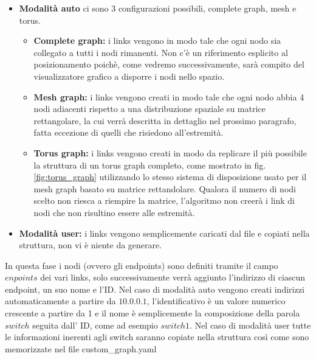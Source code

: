 \documentclass[binding=0.6cm]{sapthesis}
\begin{document}
\begin{itemize}
    \item \textbf{Modalità auto} ci sono 3 configurazioni possibili, complete graph, mesh e torus.
    \begin{itemize}
        \item \textbf{Complete graph:} i links vengono in modo tale che ogni nodo sia collegato a tutti i nodi rimanenti. Non c'è un riferimento esplicito al posizionamento poichè, come vedremo successivamente, sarà compito del visualizzatore grafico a disporre i nodi nello spazio.
        \item \textbf{Mesh graph: } i links vengono creati in modo tale che ogni nodo abbia 4 nodi adiacenti rispetto a una distribuzione spaziale su matrice rettangolare, la cui verrà descritta in dettaglio nel prossimo paragrafo, fatta eccezione di quelli che risiedono all'estremità.
        \item \textbf{Torus graph: } i links vengono creati in modo da replicare il più possibile la struttura di un torus graph completo, come mostrato in fig. \ref{fig:torus_graph} utilizzando lo stesso sistema di disposizione usato per il mesh graph basato su matrice rettandolare.
        Qualora il numero di nodi scelto non riesca a riempire la matrice, l'algoritmo non creerà i link di nodi che non risultino essere alle estremità.
    \end{itemize} 
    \item \textbf{Modalità user:} i links vengono semplicemente caricati dal file e copiati nella struttura, non vi è niente da generare.
\end{itemize}
In questa fase i nodi (ovvero gli endpoints) sono definiti tramite il campo \(enpoints\) dei vari links, solo successivamente verrà aggiunto l'indirizzo di ciascun endpoint, un suo nome e l'ID.
Nel caso di modalità auto vengono creati indirizzi automaticamente a partire da \(10.0.0.1\), l'identificativo è un valore numerico crescente a partire da 1 e il nome è semplicemente la composizione
della parola \(switch\) seguita dall' ID, come ad esempio \(switch1\).
Nel caso di modalità user tutte le informazioni inerenti agli switch saranno copiate nella struttura così come sono memorizzate nel file custom\_graph.yaml
\end{document}
